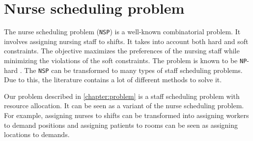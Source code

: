\documentclass[../../thesis.tex]{subfiles}
\begin{document}
\section{Nurse scheduling problem}

The nurse scheduling problem (\texttt{NSP}) is a well-known combinatorial problem.
It involves assigning nursing staff to shifts. It takes into account 
both hard and soft constraints. The objective maximizes the preferences 
of the nursing staff while minimizing the violations of the soft constraints.
The problem is known to be \texttt{NP}-hard \cite{Osogami2000}.
The \texttt{NSP} can be transformed to many types of staff scheduling problems. 
Due to this, the literature contains a lot of different methods to solve it.

Our problem described in \autoref{chapter:problem} is a staff scheduling problem with resource allocation. 
It can be seen as a variant of the nurse scheduling problem. For example, assigning nurses to shifts can be 
transformed into assigning workers to demand positions and assigning patients to rooms can be 
seen as assigning locations to demands.
\end{document}
